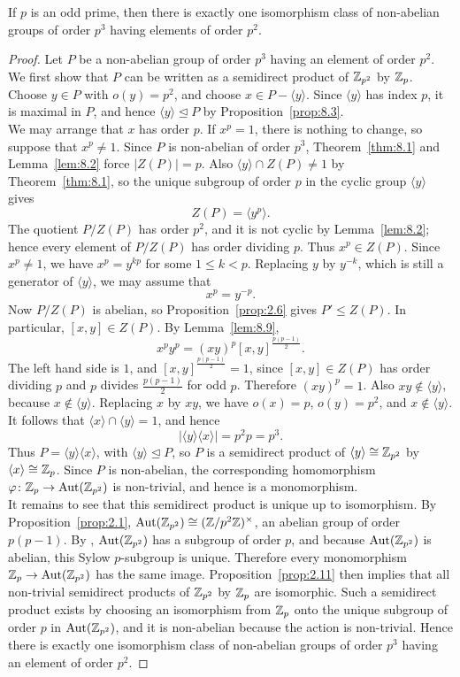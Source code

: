 \documentclass[../Odyssey_Project.tex]{subfiles}
\begin{document}
\begin{proposition}
\label{prop:8.10}
If $p$ is an odd prime, then there is exactly one isomorphism class of non-abelian groups of order $p^3$ having elements of order $p^2$.
\end{proposition}
\begin{proof}
Let $P$ be a non-abelian group of order $p^3$ having an element of order $p^2$. We first show that $P$ can be written as a semidirect product of $\mathbb{Z}_{p^2}$ by $\mathbb{Z}_p$. Choose $y\in P$ with $o(y)=p^2$, and choose $x\in P-\langle y\rangle$. Since $\langle y\rangle$ has index $p$, it is maximal in $P$, and hence $\langle y\rangle\trianglelefteq P$ by Proposition~\ref{prop:8.3}.\\
We may arrange that $x$ has order $p$. If $x^p=1$, there is nothing to change, so suppose that $x^p\neq 1$. Since $P$ is non-abelian of order $p^3$, Theorem~\ref{thm:8.1} and Lemma~\ref{lem:8.2} force $\lvert Z(P)\rvert=p$. Also $\langle y\rangle\cap Z(P)\neq 1$ by Theorem~\ref{thm:8.1}, so the unique subgroup of order $p$ in the cyclic group $\langle y\rangle$ gives
\[
    Z(P)=\langle y^p\rangle.
\]
The quotient $P/Z(P)$ has order $p^2$, and it is not cyclic by Lemma~\ref{lem:8.2}; hence every element of $P/Z(P)$ has order dividing $p$. Thus $x^p\in Z(P)$. Since $x^p\neq 1$, we have $x^p=y^{kp}$ for some $1\leq k<p$. Replacing $y$ by $y^{-k}$, which is still a generator of $\langle y\rangle$, we may assume that
\[
    x^p=y^{-p}.
\]
Now $P/Z(P)$ is abelian, so Proposition~\ref{prop:2.6} gives $P'\leq Z(P)$. In particular, $[x,y]\in Z(P)$. By Lemma~\ref{lem:8.9},
\[
    x^p y^p=(xy)^p[x,y]^{\frac{p(p-1)}{2}}.
\]
The left hand side is $1$, and $[x,y]^{\frac{p(p-1)}{2}}=1$, since $[x,y]\in Z(P)$ has order dividing $p$ and $p$ divides $\frac{p(p-1)}{2}$ for odd $p$. Therefore $(xy)^p=1$. Also $xy\notin\langle y\rangle$, because $x\notin\langle y\rangle$. Replacing $x$ by $xy$, we have $o(x)=p$, $o(y)=p^2$, and $x\notin\langle y\rangle$.\\
It follows that $\langle x\rangle\cap\langle y\rangle=1$, and hence
\[
    \lvert \langle y\rangle\langle x\rangle\rvert
    =p^2p
    =p^3.
\]
Thus $P=\langle y\rangle\langle x\rangle$, with $\langle y\rangle\trianglelefteq P$, so $P$ is a semidirect product of $\langle y\rangle\cong \mathbb{Z}_{p^2}$ by $\langle x\rangle\cong \mathbb{Z}_p$. Since $P$ is non-abelian, the corresponding homomorphism $\varphi\colon \mathbb{Z}_p\to \operatorname{Aut}(\mathbb{Z}_{p^2})$ is non-trivial, and hence is a monomorphism.\\
It remains to see that this semidirect product is unique up to isomorphism. By Proposition~\ref{prop:2.1}, $\operatorname{Aut}(\mathbb{Z}_{p^2})\cong(\mathbb{Z}/p^2\mathbb{Z})^{\times}$, an abelian group of order $p(p-1)$. By , $\operatorname{Aut}(\mathbb{Z}_{p^2})$ has a subgroup of order $p$, and because $\operatorname{Aut}(\mathbb{Z}_{p^2})$ is abelian, this Sylow $p$-subgroup is unique. Therefore every monomorphism $\mathbb{Z}_p\to \operatorname{Aut}(\mathbb{Z}_{p^2})$ has the same image. Proposition~\ref{prop:2.11} then implies that all non-trivial semidirect products of $\mathbb{Z}_{p^2}$ by $\mathbb{Z}_p$ are isomorphic. Such a semidirect product exists by choosing an isomorphism from $\mathbb{Z}_p$ onto the unique subgroup of order $p$ in $\operatorname{Aut}(\mathbb{Z}_{p^2})$, and it is non-abelian because the action is non-trivial. Hence there is exactly one isomorphism class of non-abelian groups of order $p^3$ having an element of order $p^2$.

\end{proof}
\end{document}
